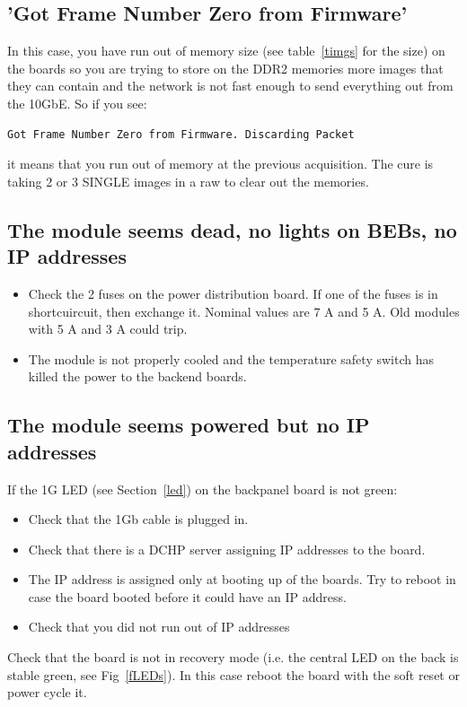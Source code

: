 \documentclass{article}
\begin{document}
\subsection{'Got Frame Number Zero from Firmware'}\label{outmemory}
In this case, you have run out of memory size (see table~\ref{timgs} for the size) on the boards so you are trying to store on the DDR2 memories more images that they can contain and the network is not fast enough to send everything out from the 10GbE.
So if you see:
\begin{verbatim}
Got Frame Number Zero from Firmware. Discarding Packet
\end{verbatim}
it means that you run out of memory at the previous acquisition. The  cure is taking 2 or 3 SINGLE images in a raw to clear out the memories.
 


\subsection{The module seems dead, no lights on BEBs, no IP addresses}
\begin{itemize}
\item Check the 2 fuses on the power distribution board. If one of the fuses is in shortcuircuit, then exchange it. Nominal values are 7 A and 5 A. Old modules with 5 A and 3 A could trip.
\item The module is not properly cooled and the temperature safety switch has killed the power to the backend boards. 
\end{itemize}

\subsection{The module seems powered but no IP addresses}
If the 1G LED (see Section~\ref{led}) on the backpanel board is not green:
\begin{itemize}
\item Check that the 1Gb cable is plugged in.
\item Check that there is a DCHP server assigning IP addresses to the board.
\item The IP address is assigned only at booting up of the boards. Try to reboot in case the board booted before it could have an IP address. 
\item Check that you did not run out of IP addresses 
\end{itemize}
 Check that the board is not in recovery mode (i.e. the central LED on the back is stable green, see Fig~\ref{fLEDs}). In this case reboot the board with the soft reset or power cycle it.
\end{document}
